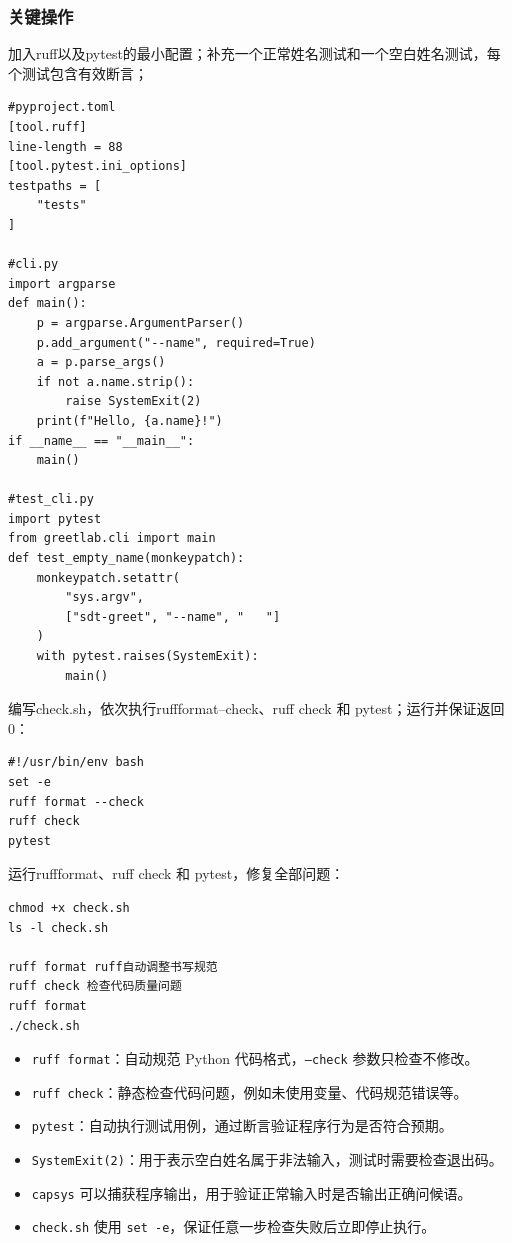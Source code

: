 \documentclass[UTF8,a4paper,11pt]{ctexart}
\begin{document}
\subsubsection{关键操作}

加入ruff以及pytest的最小配置；补充一个正常姓名测试和一个空白姓名测试，每个测试包含有效断言；

\begin{lstlisting}[style=source]
#pyproject.toml
[tool.ruff]
line-length = 88
[tool.pytest.ini_options]
testpaths = [
    "tests"
]

#cli.py
import argparse
def main():
    p = argparse.ArgumentParser()
    p.add_argument("--name", required=True)
    a = p.parse_args()
    if not a.name.strip():
        raise SystemExit(2)
    print(f"Hello, {a.name}!")
if __name__ == "__main__":
    main()

#test_cli.py
import pytest
from greetlab.cli import main
def test_empty_name(monkeypatch):
    monkeypatch.setattr(
        "sys.argv",
        ["sdt-greet", "--name", "   "]
    )
    with pytest.raises(SystemExit):
        main()
\end{lstlisting}


编写check.sh，依次执行ruffformat--check、ruff check 和 pytest；运行并保证返回0：

\begin{lstlisting}[style=source]
#!/usr/bin/env bash
set -e
ruff format --check
ruff check
pytest
\end{lstlisting}

运行ruffformat、ruff check 和 pytest，修复全部问题：

\begin{lstlisting}[style=terminal]
chmod +x check.sh
ls -l check.sh

ruff format ruff自动调整书写规范
ruff check 检查代码质量问题
ruff format
./check.sh
\end{lstlisting}


\begin{itemize}[leftmargin=2em,itemsep=0.2em,topsep=0.3em]
    \small
    \item \texttt{ruff format}：自动规范 Python 代码格式，\texttt{--check} 参数只检查不修改。
    \item \texttt{ruff check}：静态检查代码问题，例如未使用变量、代码规范错误等。
    \item \texttt{pytest}：自动执行测试用例，通过断言验证程序行为是否符合预期。
    \item \texttt{SystemExit(2)}：用于表示空白姓名属于非法输入，测试时需要检查退出码。
    \item \texttt{capsys} 可以捕获程序输出，用于验证正常输入时是否输出正确问候语。
    \item \texttt{check.sh} 使用 \texttt{set -e}，保证任意一步检查失败后立即停止执行。
\end{itemize}
\end{document}
